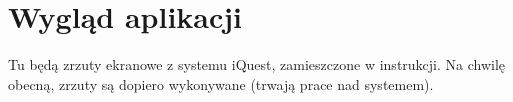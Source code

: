 \chapter{Wygląd aplikacji}
\label{Chapterb1}

{\color{red}Tu będą zrzuty ekranowe z systemu iQuest, zamieszczone w instrukcji. Na chwilę obecną, zrzuty są dopiero wykonywane (trwają prace nad systemem).}